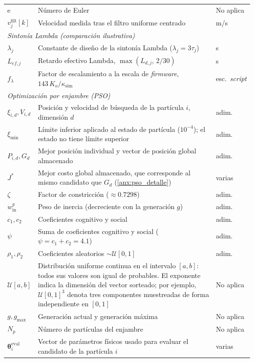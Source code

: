 \begin{appendices}
{\begin{longtable}{p{2.7cm} p{8.5cm} p{2.2cm}}
$\mathrm{e}$ & Número de Euler & No aplica \\
$v_j^{\mathrm{filt}}[k]$ & Velocidad medida tras el filtro uniforme centrado & m/s \\
\midrule \multicolumn{3}{l}{\textit{Sintonía Lambda (comparación ilustrativa)}} \\
$\lambda_j$ & Constante de diseño de la sintonía Lambda ($\lambda_j=3\tau_j$) & s \\
$L_{ef,j}$ & Retardo efectivo Lambda, $\max(L_{d,j},\,2/30)$ & s \\
$f_{\lambda}$ & Factor de escalamiento a la escala de \textit{firmware}, $143\,K_o/\kappa_{\mathrm{sim}}$ & esc.\ \textit{script} \\
\multicolumn{3}{l}{\textit{Optimización por enjambre (PSO)}}\\
$\xi_{i,d},V_{i,d}$ & Posición y velocidad de búsqueda de la partícula $i$, dimensión $d$ & adim. \\
$\xi_{\min}$ & Límite inferior aplicado al estado de partícula ($10^{-4}$); el estado no tiene límite superior & adim. \\
$P_{i,d},G_d$ & Mejor posición individual y vector de posición global almacenado & adim. \\
$J^*$ & Mejor costo global almacenado, que corresponde al mismo candidato que $G_d$ (\ref{anx:pso_detalle}) & varias \\
$\zeta$ & Factor de constricción ($\approx0.7298$) & adim. \\
$w_{\mathrm{in}}^{g}$ & Peso de inercia (decreciente con la generación $g$) & adim. \\
$c_1,c_2$ & Coeficientes cognitivo y social & adim. \\
$\psi$ & Suma de coeficientes cognitivo y social ($\psi=c_1+c_2=4.1$) & adim. \\
$\rho_1,\rho_2$ & Coeficientes aleatorios $\sim\mathcal{U}[0,1]$ & adim. \\
$\mathcal{U}[a,b]$ & Distribución uniforme continua en el intervalo $[a,b]$: todos sus valores son igual de probables. El exponente indica la dimensión del vector sorteado; por ejemplo, $\mathcal{U}[0,1]^3$ denota tres componentes muestreadas de forma independiente en $[0,1]$ & No aplica \\
$g,g_{\max}$ & Generación actual y generación máxima & No aplica \\
$N_p$ & Número de partículas del enjambre & No aplica \\
$\boldsymbol{\theta}_i^{\mathrm{eval}}$ & Vector de parámetros físicos usado para evaluar el candidato de la partícula $i$ & varias \\

\end{longtable}}
\end{appendices}
